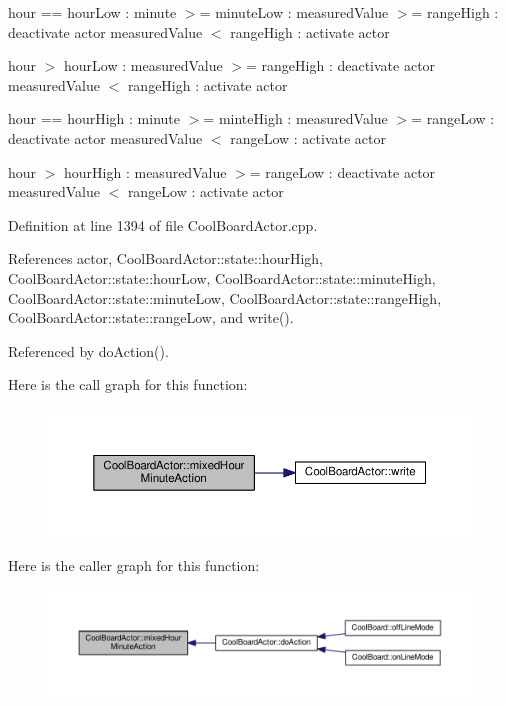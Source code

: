 hour == hour\+Low \+: minute $>$= minute\+Low \+: measured\+Value $>$= range\+High \+: deactivate actor measured\+Value $<$ range\+High \+: activate actor

hour $>$ hour\+Low \+: measured\+Value $>$= range\+High \+: deactivate actor measured\+Value $<$ range\+High \+: activate actor

hour == hour\+High \+: minute $>$= minte\+High \+: measured\+Value $>$= range\+Low \+: deactivate actor measured\+Value $<$ range\+Low \+: activate actor

hour $>$ hour\+High \+: measured\+Value $>$= range\+Low \+: deactivate actor measured\+Value $<$ range\+Low \+: activate actor 

Definition at line 1394 of file Cool\+Board\+Actor.\+cpp.



References actor, Cool\+Board\+Actor\+::state\+::hour\+High, Cool\+Board\+Actor\+::state\+::hour\+Low, Cool\+Board\+Actor\+::state\+::minute\+High, Cool\+Board\+Actor\+::state\+::minute\+Low, Cool\+Board\+Actor\+::state\+::range\+High, Cool\+Board\+Actor\+::state\+::range\+Low, and write().



Referenced by do\+Action().

Here is the call graph for this function\+:\nopagebreak
\begin{figure}[H]
\begin{center}
\leavevmode
\includegraphics[width=350pt]{dc/d69/class_cool_board_actor_ae6b2a17b0e73cfeb353ded2cc4e08109_cgraph}
\end{center}
\end{figure}
Here is the caller graph for this function\+:\nopagebreak
\begin{figure}[H]
\begin{center}
\leavevmode
\includegraphics[width=350pt]{dc/d69/class_cool_board_actor_ae6b2a17b0e73cfeb353ded2cc4e08109_icgraph}
\end{center}
\end{figure}
\mbox{\label{class_cool_board_actor_a5af5538fc7d169f63127e06d5219bcd4}} 
